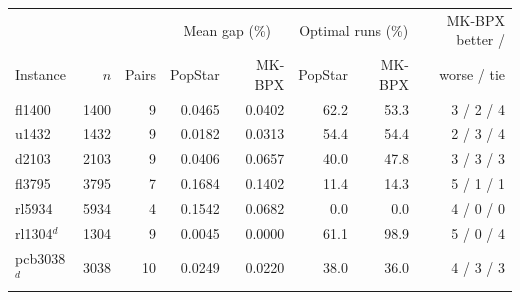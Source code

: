 \begin{tabular}{lrrrrrrr}
\toprule
 & & & \multicolumn{2}{c}{Mean gap (\%)} & \multicolumn{2}{c}{Optimal runs (\%)} & MK-BPX better / \\
Instance & $n$ & Pairs & PopStar & MK-BPX & PopStar & MK-BPX & worse / tie \\
\midrule
fl1400 & 1400 & 9 & 0.0465 & 0.0402 & 62.2 & 53.3 & 3 / 2 / 4 \\
u1432 & 1432 & 9 & 0.0182 & 0.0313 & 54.4 & 54.4 & 2 / 3 / 4 \\
d2103 & 2103 & 9 & 0.0406 & 0.0657 & 40.0 & 47.8 & 3 / 3 / 3 \\
fl3795 & 3795 & 7 & 0.1684 & 0.1402 & 11.4 & 14.3 & 5 / 1 / 1 \\
rl5934 & 5934 & 4 & 0.1542 & 0.0682 & 0.0 & 0.0 & 4 / 0 / 0 \\
\midrule
rl1304$^{d}$ & 1304 & 9 & 0.0045 & 0.0000 & 61.1 & 98.9 & 5 / 0 / 4 \\
pcb3038$^{d}$ & 3038 & 10 & 0.0249 & 0.0220 & 38.0 & 36.0 & 4 / 3 / 3 \\
\bottomrule
\end{tabular}